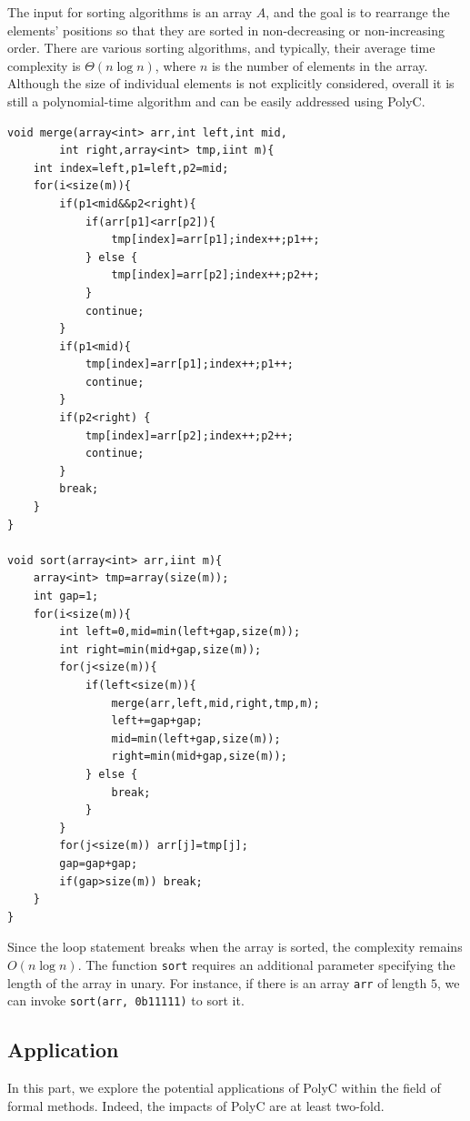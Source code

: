 \documentclass[runningheads]{llncs}
\begin{document}
\begin{example}
\label{exp:sorting}
The input for sorting algorithms is an array $A$, and the goal is to rearrange the elements' positions so that they are sorted in non-decreasing or non-increasing order.
There are various sorting algorithms, and typically, their average time complexity is $\Theta(n\log n)$, where $n$ is the number of elements in the array.
Although the size of individual elements is not explicitly considered, overall it is still a polynomial-time algorithm and can be easily addressed using PolyC.
\begin{lstlisting}
void merge(array<int> arr,int left,int mid,
        int right,array<int> tmp,iint m){
    int index=left,p1=left,p2=mid;
    for(i<size(m)){
        if(p1<mid&&p2<right){
            if(arr[p1]<arr[p2]){
                tmp[index]=arr[p1];index++;p1++;
            } else {
                tmp[index]=arr[p2];index++;p2++;
            }
            continue;
        }
        if(p1<mid){
            tmp[index]=arr[p1];index++;p1++;
            continue;
        }
        if(p2<right) {
            tmp[index]=arr[p2];index++;p2++;
            continue;
        }
        break;
    }
}

void sort(array<int> arr,iint m){
    array<int> tmp=array(size(m));
    int gap=1;
    for(i<size(m)){
        int left=0,mid=min(left+gap,size(m));
        int right=min(mid+gap,size(m));
        for(j<size(m)){
            if(left<size(m)){
                merge(arr,left,mid,right,tmp,m);
                left+=gap+gap;
                mid=min(left+gap,size(m));
                right=min(mid+gap,size(m));
            } else {
                break;
            }
        }
        for(j<size(m)) arr[j]=tmp[j];
        gap=gap+gap;
        if(gap>size(m)) break;
    }
}
\end{lstlisting}
Since the loop statement breaks when the array is sorted, the complexity remains $O(n\log n)$.
The function \texttt{sort} requires an additional parameter specifying the length of the array in unary.
For instance, if there is an array \texttt{arr} of length $5$, we can invoke \texttt{sort(arr, 0b11111)} to sort it.

\end{example}


\subsection{Application}\label{subsec:application}
In this part, we explore the potential applications of PolyC within the field of formal methods.
Indeed, the impacts of PolyC are at least two-fold.
\end{document}
